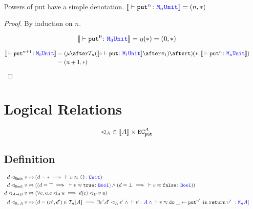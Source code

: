 \documentclass{Report}
\begin{document}
\begin{lemma}
    Powers of put have a simple denotation.
$\deno{\ztyperelation{\put^n}{\M{n}{\U}}} = (n, \singleton)$    
\end{lemma}

\begin{proof}
    By induction on $n$.

    
    \begin{equation}
        \deno{\ztyperelation{\put^0}{\M{0}{\U}}} = \point{}(\singleton) = (0, \singleton)
    \end{equation}
    
    \begin{align}
        \deno{\ztyperelation{\put^{n+1}}{\M{0}{\U}}} & = (\bindmu\after\T{n}{(\deno{\typerelation{\nil}{\put}{\M{1}{\U}}}\after\p)}\after \strengtht)(\singleton, \deno{\ztyperelation{\put^n}{\M{n}{\U}}})\\
        & = (n+1, \singleton)
    \end{align}
\end{proof}

\section{Logical Relations}

\begin{equation}
    \label{LogicalRelationType}
    \lhd_A \in {\bf [\![}A{\bf ]\!]} \times \texttt{EC}_{\texttt{put}}^A    
\end{equation}

\subsection{Definition}
\begin{definition}

    \begin{align}
        \label{LogicalRelationDefinition}
        \logRel{d}{\U}{v} & \Leftrightarrow (d=\singleton \implies \zberelation{v}{\u}{\U})\\
        \logRel{d}{\B}{v} & \Leftrightarrow ((d=\top \implies \zberelation{v}{\t}{\B}) \wedge (d=\bot \implies \zberelation{v}{\f}{\B}))\\
        \logRel{d}{\ab}{v} & \Leftrightarrow (\forall e, u. \logRel{e}{A}{u}\implies \logRel{d(e)}{B}{\apply{v}{u}})\\
        \logRel{d}{\mna}{v}&\Leftrightarrow  (d= (n', d')\in \T{n}{\deno{A}} \implies \exists v'. \logRel{d'}{A}{v'} \wedge \ztyperelation{v'}{A}\wedge \zberelation{v}{\doin{\_}{\put^{n'}}{\return{v'}}}{\mna})
    \end{align}
\end{definition}
\end{document}

